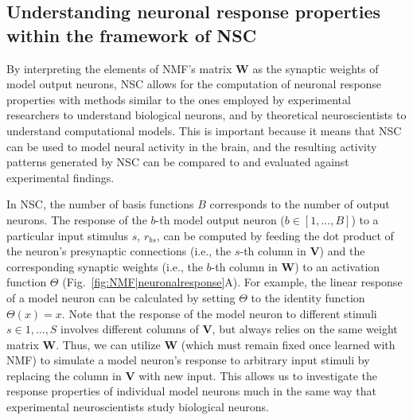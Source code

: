 \subsection*{Understanding neuronal response properties within the framework of NSC}


By interpreting the elements of \ac{NMF}'s
matrix \textbf{W} as the synaptic weights of model output neurons,
\ac{NSC} allows for the computation of neuronal response properties
with
methods similar to the ones employed by experimental researchers to understand biological neurons,
and by theoretical neuroscientists to understand computational models. This is important because it means that NSC can be used to model neural activity in the brain, and the resulting activity patterns generated by NSC can be compared to and evaluated against experimental findings. 

In \ac{NSC}, the number of basis functions $B$ corresponds to the number of output neurons. The response of the $b$-th model output neuron
($b \in [1, ..., B]$)
to a particular input stimulus $s$, $r_{bs}$,
can be computed by feeding the dot product of the neuron's presynaptic connections
(i.e., the $s$-th column in \textbf{V})
and the corresponding synaptic weights
(i.e., the $b$-th column in $\mathbf{W}$)
to an activation function $\Theta$
(Fig.~\ref{fig:NMF|neuronalresponse}A).
For example, the linear response of a model neuron
can be calculated by setting $\Theta$ to the identity function $\Theta(x)=x$.
Note that the response of the model neuron to different stimuli 
$s \in 1, \ldots, S$
involves different columns of \textbf{V},
but always relies on the same weight matrix \textbf{W}.
Thus, we can utilize \textbf{W}
(which must remain fixed once learned with \ac{NMF})
to simulate a model neuron's response to arbitrary input stimuli
by replacing the column in \textbf{V} with new input.
This allows us to investigate the response properties of individual model neurons
much in the same way that experimental neuroscientists study biological neurons.

